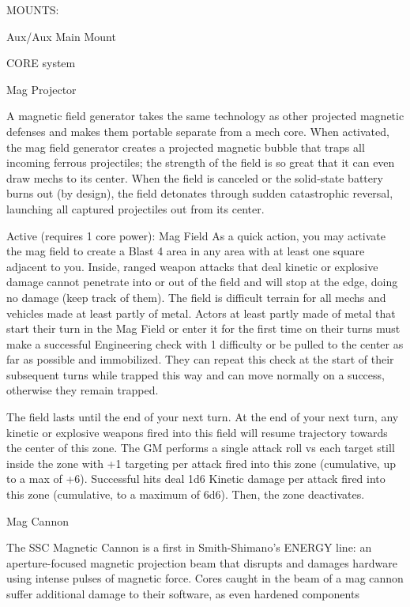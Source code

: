                                                  MOUNTS:

 Aux/Aux                                             Main Mount

                                               CORE system




                                                     Mag Projector

 A magnetic field generator takes the same technology as other projected magnetic defenses and makes
  them portable separate from a mech core. When activated, the mag field generator creates a projected
 magnetic bubble that traps all incoming ferrous projectiles; the strength of the field is so great that it can
 even draw mechs to its center. When the field is canceled or the solid-state battery burns out (by
 design), the field detonates through sudden catastrophic reversal, launching all captured projectiles out
 from its center.

 Active (requires 1 core power): Mag Field
 As a quick action, you may activate the mag field to create a Blast 4 area in any area with at least one
  square adjacent to you. Inside, ranged weapon attacks that deal kinetic or explosive damage cannot
  penetrate into or out of the field and will stop at the edge, doing no damage (keep track of them). The
 field is difficult terrain for all mechs and vehicles made at least partly of metal. Actors at least partly
  made of metal that start their turn in the Mag Field or enter it for the first time on their turns must make
  a successful Engineering check with 1 difficulty or be pulled to the center as far as possible and
  immobilized. They can repeat this check at the start of their subsequent turns while trapped this way
  and can move normally on a success, otherwise they remain trapped.

 The field lasts until the end of your next turn. At the end of your next turn, any kinetic or explosive
 weapons fired into this field will resume trajectory towards the center of this zone. The GM performs a
  single attack roll vs each target still inside the zone with +1 targeting per attack fired into this zone
  (cumulative, up to a max of +6). Successful hits deal 1d6 Kinetic damage per attack fired into this zone
  (cumulative, to a maximum of 6d6). Then, the zone deactivates.

Mag Cannon

The SSC Magnetic Cannon is a first in Smith-Shimano’s ENERGY line: an aperture-focused magnetic
projection beam that disrupts and damages hardware using intense pulses of magnetic force. Cores caught
in the beam of a mag cannon suffer additional damage to their software, as even hardened components

